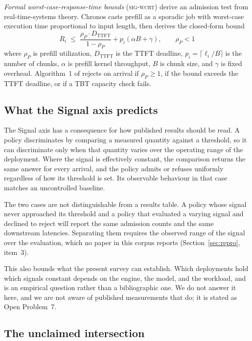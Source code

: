 \documentclass[11pt,letterpaper]{article}
\theoremstyle{definition}
\begin{document}
\textit{Formal worst-case-response-time bounds} (\textsc{sig-wcrt})
derive an admission test from real-time-systems theory. Chronos casts prefill as a
sporadic job with worst-case execution time proportional to input
length, then derives the closed-form bound
%
\begin{equation}
R_i \;\le\; \frac{\rho_P \cdot D_{\text{TTFT}}}{1 - \rho_P} + p_i(\alpha B + \gamma), \qquad \rho_P < 1
\label{eq:chronos-wcrt}
\end{equation}
%
where $\rho_P$ is prefill utilization, $D_{\text{TTFT}}$ is the TTFT
deadline, $p_i = \lceil \ell_i / B \rceil$ is the number of chunks,
$\alpha$ is prefill kernel throughput, $B$ is chunk size, and $\gamma$
is fixed overhead. Algorithm~1 of \cite{marref2026chronos} rejects on
arrival if $\rho_P \ge 1$, if the bound exceeds the TTFT deadline, or
if a TBT capacity check fails.

\subsection{What the Signal axis predicts}
\label{sec:signal-predicts}

The Signal axis has a consequence for how published results should be
read. A policy discriminates by comparing a measured quantity against a
threshold, so it can discriminate only when that quantity varies over
the operating range of the deployment. Where the signal is effectively
constant, the comparison returns the same answer for every arrival, and
the policy admits or refuses uniformly regardless of how its threshold
is set. Its observable behaviour in that case matches an uncontrolled
baseline.

The two cases are not distinguishable from a results table. A policy
whose signal never approached its threshold and a policy that evaluated
a varying signal and declined to reject will report the same admission
counts and the same downstream latencies. Separating them requires the
observed range of the signal over the evaluation, which no paper in this
corpus reports (Section~\ref{sec:repro}, item~3).

This also bounds what the present survey can establish. Which
deployments hold which signals constant depends on the engine, the
model, and the workload, and is an empirical question rather than a
bibliographic one. We do not answer it here, and we are not aware of
published measurements that do; it is stated as Open Problem~7.

\subsection{The unclaimed intersection}
\end{document}
